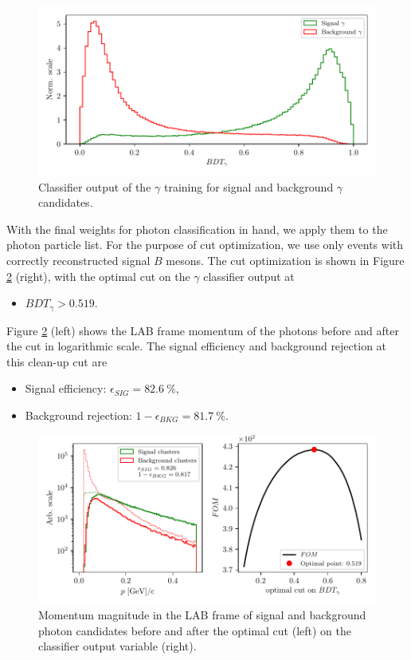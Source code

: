 \documentclass[oneside,a4paper,openany,12pt]{scrbook}
\begin{document}
\begin{figure}[H]
\centering
\captionsetup{width=0.8\linewidth}
\includegraphics[width=\linewidth]{fig/ROECleanup_gamma}
\caption{Classifier output of the $\gamma$ training for signal and background $\gamma$ candidates.}
\label{fig:ROE_gamma}
\end{figure}

With the final weights for photon classification in hand, we apply them to the photon particle list. For the purpose of cut optimization, we use only events with correctly reconstructed signal $B$ mesons. The cut optimization is shown in Figure \ref{fig:ROE_gamma_opt} (right), with the optimal cut on the $\gamma$ classifier output at
\begin{itemize}
\item $BDT_\gamma > 0.519$.
\end{itemize}

Figure \ref{fig:ROE_gamma_opt} (left) shows the LAB frame momentum of the photons before and after the cut in logarithmic scale. The signal efficiency and background rejection at this clean-up cut are
\begin{itemize}
\item Signal efficiency: $\epsilon_{SIG} = 82.6~\%$,
\item Background rejection: $1-\epsilon_{BKG} = 81.7~\%$.
\end{itemize}

\begin{figure}[H]
\centering
\captionsetup{width=0.8\linewidth}
\includegraphics[width=\linewidth]{fig/ROECleanup_gamma_opt}
\caption{Momentum magnitude in the LAB frame of signal and background photon candidates before and after the optimal cut (left) on the classifier output variable (right).}
\label{fig:ROE_gamma_opt}
\end{figure}
\end{document}
